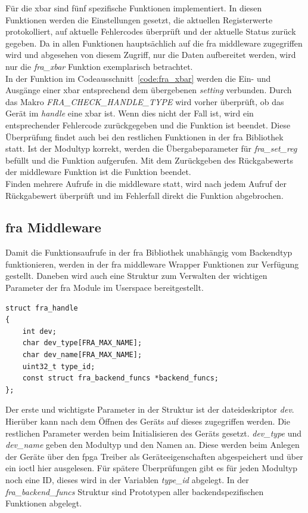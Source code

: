 Für die \ac{xbar} sind fünf spezifische Funktionen implementiert. In diesen Funktionen werden die Einstellungen gesetzt, die aktuellen Registerwerte protokolliert, auf aktuelle Fehlercodes überprüft und der aktuelle Status zurück gegeben. Da in allen Funktionen hauptsächlich auf die \ac{fra} \gls{middleware} zugegriffen wird und abgesehen von diesem Zugriff, nur die Daten aufbereitet werden, wird nur die \textit{fra\_xbar} Funktion exemplarisch betrachtet.\\

In der Funktion im Codeausschnitt~\ref{code:fra_xbar} werden die Ein- und Ausgänge einer \ac{xbar} entsprechend dem übergebenen \textit{setting} verbunden.
Durch das Makro \textit{FRA\_CHECK\_HANDLE\_TYPE} wird vorher überprüft, ob das Gerät im \textit{handle} eine \ac{xbar} ist. Wenn dies nicht der Fall ist, wird ein entsprechender Fehlercode zurückgegeben und die Funktion ist beendet. Diese Überprüfung findet auch bei den restlichen Funktionen in der \ac{fra} Bibliothek statt.
Ist der Modultyp korrekt, werden die Übergabeparameter für \textit{fra\_set\_reg} befüllt und die Funktion aufgerufen. Mit dem Zurückgeben des Rückgabewerts der \gls{middleware} Funktion ist die Funktion beendet.\\

Finden mehrere Aufrufe in die \gls{middleware} statt, wird nach jedem Aufruf der Rückgabewert überprüft und im Fehlerfall direkt die Funktion abgebrochen.


\subsection{\acs{fra} Middleware}\label{sec:middleware}
Damit die Funktionsaufrufe in der \ac{fra} Bibliothek unabhängig vom Backendtyp funktionieren, werden in der \ac{fra} \gls{middleware} Wrapper Funktionen zur Verfügung gestellt. Daneben wird auch eine Struktur zum Verwalten der wichtigen Parameter der \ac{fra} Module im Userspace bereitgestellt.


\begin{lstfloat}
\begin{lstlisting}
struct fra_handle
{
	int dev;
	char dev_type[FRA_MAX_NAME];
	char dev_name[FRA_MAX_NAME];
	uint32_t type_id;
	const struct fra_backend_funcs *backend_funcs;
};
\end{lstlisting}
\end{lstfloat}
Der erste und wichtigste Parameter in der Struktur ist der \gls{dateideskriptor} \textit{dev}. Hierüber kann nach dem Öffnen des Geräts auf dieses zugegriffen werden. Die restlichen Parameter werden beim Initialisieren des Geräts gesetzt. \textit{dev\_type} und \textit{dev\_name} geben den Modultyp und den Namen an. Diese werden beim Anlegen der Geräte über den \ac{fpga} Treiber als Geräteeigenschaften abgespeichert und über ein \ac{ioctl} hier ausgelesen.
Für spätere Überprüfungen gibt es für jeden Modultyp noch eine ID, dieses wird in der Variablen \textit{type\_id} abgelegt. In der \textit{fra\_backend\_funcs} Struktur sind Prototypen aller backendspezifischen Funktionen abgelegt. \\

